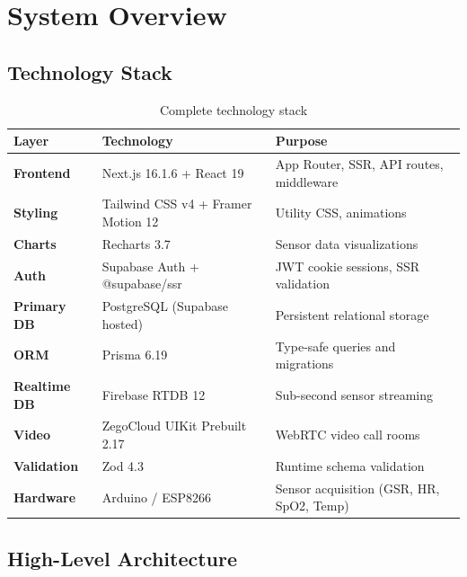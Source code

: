 \documentclass[12pt,a4paper]{report}
\begin{document}
\chapter{System Overview}

\section{Technology Stack}

\begin{table}[H]\centering\renewcommand{\arraystretch}{1.4}
\begin{tabularx}{\linewidth}{>{\bfseries}l l X}
\toprule
Layer & Technology & Purpose \\
\midrule
Frontend & Next.js 16.1.6 + React 19 & App Router, SSR, API routes, middleware \\
Styling & Tailwind CSS v4 + Framer Motion 12 & Utility CSS, animations \\
Charts & Recharts 3.7 & Sensor data visualizations \\
\midrule
Auth & Supabase Auth + @supabase/ssr & JWT cookie sessions, SSR validation \\
\midrule
Primary DB & PostgreSQL (Supabase hosted) & Persistent relational storage \\
ORM & Prisma 6.19 & Type-safe queries and migrations \\
Realtime DB & Firebase RTDB 12 & Sub-second sensor streaming \\
\midrule
Video & ZegoCloud UIKit Prebuilt 2.17 & WebRTC video call rooms \\
Validation & Zod 4.3 & Runtime schema validation \\
Hardware & Arduino / ESP8266 & Sensor acquisition (GSR, HR, SpO2, Temp) \\
\bottomrule
\end{tabularx}
\caption{Complete technology stack}
\end{table}

\section{High-Level Architecture}
\end{document}
